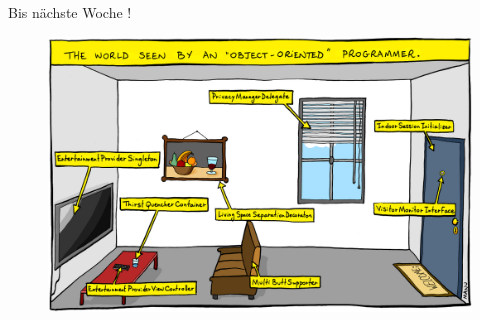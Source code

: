 \documentclass[18pt]{beamer}
\begin{document}
\begin{frame}{Bis nächste Woche !}
    \begin{figure}
        \includegraphics[scale=2]{img/oop.png}
    \end{figure}
\end{frame}

\backupend
\end{document}
